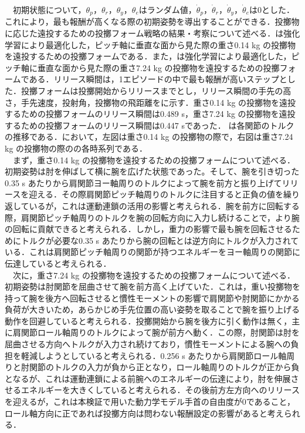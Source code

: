 \begin{small}
　初期状態について，$\theta_{p}$，$\theta_{r}$，$\theta_{y}$，$\theta_{e}$はランダム値，$\dot{\theta}_{p}$，$\dot{\theta}_{r}$，$\dot{\theta}_{y}$，$\dot{\theta}_{e}$は0とした．これにより，最も報酬が高くなる際の初期姿勢を導出することができる．投擲物に応じた遠投するための投擲フォーム戦略の結果・考察について述べる．は強化学習により最適化した，ピッチ軸に垂直な面から見た際の重さ0.14 kg の投擲物を遠投するための投擲フォームである．また，は強化学習により最適化した，ピッチ軸に垂直な面から見た際の重さ7.24 kg の投擲物を遠投するための投擲フォームである．リリース瞬間は，1エピソードの中で最も報酬が高いステップとした．投擲フォームは投擲開始からリリースまでとし，リリース瞬間の手先の高さ，手先速度，投射角，投擲物の飛距離をに示す．重さ0.14 kg の投擲物を遠投するための投擲フォームのリリース瞬間は0.489 s，重さ7.24 kg の投擲物を遠投するための投擲フォームのリリース瞬間は0.447 sであった．
は各関節のトルクの推移である．において，左図は重さ0.14 kg の投擲物の際で，右図は重さ7.24 kg の投擲物の際のの各時系列である．\\
　まず，重さ0.14 kg の投擲物を遠投するための投擲フォームについて述べる．初期姿勢は肘を伸ばして横に腕を広げた状態であった。そして、腕を引き切った0.35 s あたりから肩関節ヨー軸周りのトルクによって腕を前方と振り上げてリリースを迎える．その際肩関節ピッチ軸周りのトルクに注目すると正負の値を繰り返しているが，これは運動連鎖の活用の影響と考えられる．腕を前方に回転する際，肩関節ピッチ軸周りのトルクを腕の回転方向に入力し続けることで，より腕の回転に貢献できると考えられる．しかし，重力の影響で最も腕を回転させるためにトルクが必要な0.35 s あたりから腕の回転とは逆方向にトルクが入力されている．これは肩関節ピッチ軸周りの関節が持つエネルギーをヨー軸周りの関節に伝達していると考えられる．\\
　次に，重さ7.24 kg の投擲物を遠投するための投擲フォームについて述べる．初期姿勢は肘関節を屈曲させて腕を前方高く上げていた．これは，重い投擲物を持って腕を後方へ回転させると慣性モーメントの影響で肩関節や肘関節にかかる負荷が大きいため，あらかじめ手先位置の高い姿勢を取ることで腕を振り上げる動作を回避していると考えられる．投擲開始から腕を後方に引く動作は無く，主に肩関節ロール軸周りのトルクによって腕が前方へ動く．この際，肘関節は肘を屈曲させる方向へトルクが入力され続けており，慣性モーメントによる腕への負担を軽減しようとしていると考えられる．0.256 s あたりから肩関節ロール軸周りと肘関節のトルクの入力が負から正となり，ロール軸周りのトルクが正から負となるが、これは運動連鎖による前腕へのエネルギーの伝達により，肘を伸展させるエネルギーを大きくしていると考えられる．その後前方左方向へのリリースを迎えるが，これは本検証で用いた動力学モデル手首の自由度が0であること，ロール軸方向に正であれば投擲方向は問わない報酬設定の影響があると考えられる．\\

\end{small}
